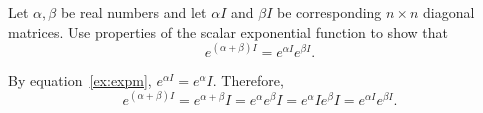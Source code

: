 \documentclass{ximera}
\begin{document}
\begin{exercise} \label{c6.2.5}
Let $\alpha,\beta$ be real numbers and let $\alpha I$ and $\beta
I$ be corresponding $n\times n$ diagonal matrices.  Use
properties of the scalar exponential function to show that
\[
     e^{(\alpha + \beta)I} = e^{\alpha I}e^{\beta I}.
\]

\begin{solution}

By equation~\eqref{ex:expm}, $e^{\alpha I} = e^\alpha I$.  Therefore,
\[ e^{(\alpha + \beta)I} = e^{\alpha + \beta}I = e^\alpha e^\beta I
= e^\alpha I e^\beta I = e^{\alpha I}e^{\beta I}. \]

\end{solution}
\end{exercise}
\end{document}
